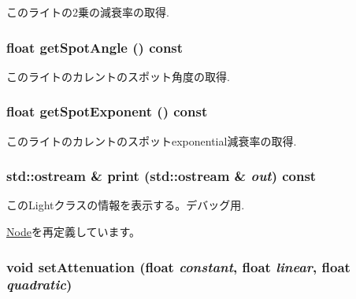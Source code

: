 このライトの2乗の減衰率の取得. \hypertarget{classm3g_1_1Light_1117f914d754fe74c090dc97bde905eb}{
\subsubsection[{getSpotAngle}]{\setlength{\rightskip}{0pt plus 5cm}float getSpotAngle () const}}
\label{classm3g_1_1Light_1117f914d754fe74c090dc97bde905eb}


このライトのカレントのスポット角度の取得. \hypertarget{classm3g_1_1Light_a359fee191741efb7e576616a59a76f7}{
\subsubsection[{getSpotExponent}]{\setlength{\rightskip}{0pt plus 5cm}float getSpotExponent () const}}
\label{classm3g_1_1Light_a359fee191741efb7e576616a59a76f7}


このライトのカレントのスポットexponential減衰率の取得. \hypertarget{classm3g_1_1Light_6fea17fa1532df3794f8cb39cb4f911f}{
\subsubsection[{print}]{\setlength{\rightskip}{0pt plus 5cm}std::ostream \& print (std::ostream \& {\em out}) const}}
\label{classm3g_1_1Light_6fea17fa1532df3794f8cb39cb4f911f}


このLightクラスの情報を表示する。デバッグ用. 

\hyperlink{classm3g_1_1Node_6fea17fa1532df3794f8cb39cb4f911f}{Node}を再定義しています。\hypertarget{classm3g_1_1Light_391c5cff137fc2e810f5129a5381196f}{
\subsubsection[{setAttenuation}]{\setlength{\rightskip}{0pt plus 5cm}void setAttenuation (float {\em constant}, \/  float {\em linear}, \/  float {\em quadratic})}}
\label{classm3g_1_1Light_391c5cff137fc2e810f5129a5381196f}


